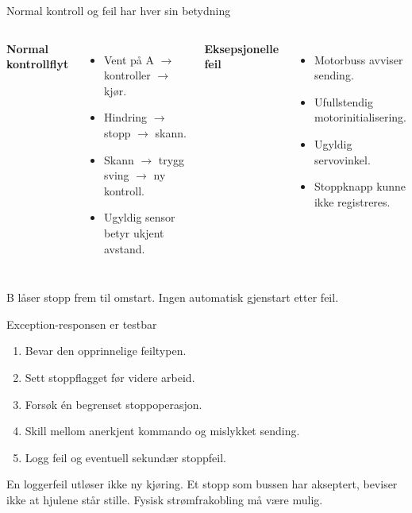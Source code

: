 \documentclass[aspectratio=169,11pt]{beamer}
\begin{document}
\begin{frame}{Normal kontroll og feil har hver sin betydning}
\begin{columns}[T]
\textbf{Normal kontrollflyt}
\begin{itemize}
\item Vent på A $\rightarrow$ kontroller $\rightarrow$ kjør.
\item Hindring $\rightarrow$ stopp $\rightarrow$ skann.
\item Skann $\rightarrow$ trygg sving $\rightarrow$ ny kontroll.
\item Ugyldig sensor betyr ukjent avstand.
\end{itemize}
\textbf{Eksepsjonelle feil}
\begin{itemize}
\item Motorbuss avviser sending.
\item Ufullstendig motorinitialisering.
\item Ugyldig servovinkel.
\item Stoppknapp kunne ikke registreres.
\end{itemize}
\end{columns}
\vspace{6mm}
\alert{B låser stopp frem til omstart. Ingen automatisk gjenstart etter feil.}
\end{frame}

\begin{frame}{Exception-responsen er testbar}
\begin{enumerate}
\item Bevar den opprinnelige feiltypen.
\item Sett stoppflagget før videre arbeid.
\item Forsøk én begrenset stoppoperasjon.
\item Skill mellom anerkjent kommando og mislykket sending.
\item Logg feil og eventuell sekundær stoppfeil.
\end{enumerate}
\vspace{6mm}
En loggerfeil utløser ikke ny kjøring. Et stopp som bussen har akseptert,
beviser ikke at hjulene står stille. Fysisk strømfrakobling må være mulig.
\end{frame}
\end{document}
